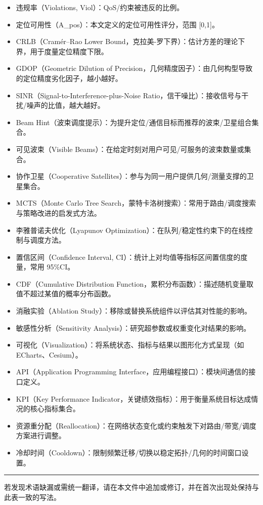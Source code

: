\begin{itemize}
\item
  违规率（Violations, Viol）：QoS/约束被违反的比例。
\item
  定位可用性（A\_pos）：本文定义的定位可用性评分，范围 {[}0,1{]}。
\item
  CRLB（Cramér--Rao Lower
  Bound，克拉美-罗下界）：估计方差的理论下界，用于度量定位精度下限。
\item
  GDOP（Geometric Dilution of
  Precision，几何精度因子）：由几何构型导致的定位精度劣化因子，越小越好。
\item
  SINR（Signal-to-Interference-plus-Noise
  Ratio，信干噪比）：接收信号与干扰/噪声的比值，越大越好。
\item
  Beam
  Hint（波束调度提示）：为提升定位/通信目标而推荐的波束/卫星组合集合。
\item
  可见波束（Visible
  Beams）：在给定时刻对用户可见/可服务的波束数量或集合。
\item
  协作卫星（Cooperative
  Satellites）：参与为同一用户提供几何/测量支撑的卫星集合。
\item
  MCTS（Monte Carlo Tree
  Search，蒙特卡洛树搜索）：常用于路由/调度搜索与策略改进的启发式方法。
\item
  李雅普诺夫优化（Lyapunov
  Optimization）：在队列/稳定性约束下的在线控制与调度方法。
\item
  置信区间（Confidence Interval,
  CI）：统计上对均值等指标区间置信度的度量，常用 95\%CI。
\item
  CDF（Cumulative Distribution
  Function，累积分布函数）：描述随机变量取值不超过某值的概率分布函数。
\item
  消融实验（Ablation Study）：移除或替换系统组件以评估其对性能的影响。
\item
  敏感性分析（Sensitivity Analysis）：研究超参数或权重变化对结果的影响。
\item
  可视化（Visualization）：将系统状态、指标与结果以图形化方式呈现（如
  ECharts、Cesium）。
\item
  API（Application Programming
  Interface，应用编程接口）：模块间通信的接口定义。
\item
  KPI（Key Performance
  Indicator，关键绩效指标）：用于衡量系统目标达成情况的核心指标集合。
\item
  资源重分配（Reallocation）：在网络状态变化或约束触发下对路由/带宽/调度方案进行调整。
\item
  冷却时间（Cooldown）：限制频繁迁移/切换以稳定拓扑/几何的时间窗口设置。
\end{itemize}

\begin{center}\rule{0.5\linewidth}{0.5pt}\end{center}

若发现术语缺漏或需统一翻译，请在本文件中追加或修订，并在首次出现处保持与此表一致的写法。
